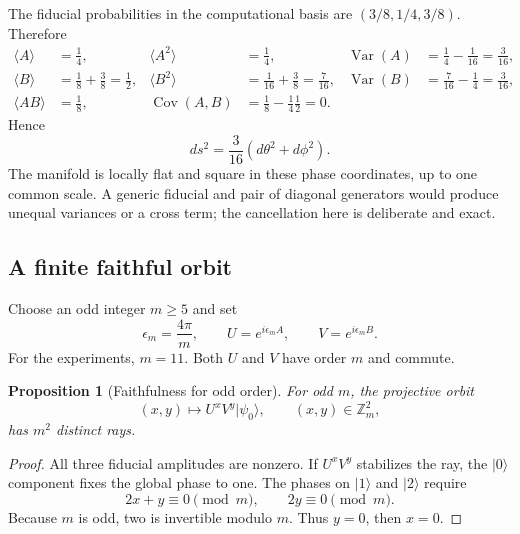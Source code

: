 \documentclass[11pt]{article}
\newtheorem{proposition}[theorem]{Proposition}
\theoremstyle{definition}
\theoremstyle{remark}
\newcommand{\Z}{\mathbb Z}
\newcommand{\ket}[1]{\lvert #1\rangle}
\begin{document}
The fiducial probabilities in the computational basis are
$(3/8,1/4,3/8)$. Therefore
\begin{align}
 \langle A\rangle&=\frac14,&
 \langle A^2\rangle&=\frac14,&
 \operatorname{Var}(A)&=\frac14-\frac1{16}=\frac3{16},\nonumber\\
 \langle B\rangle&=\frac18+\frac38=\frac12,&
 \langle B^2\rangle&=\frac1{16}+\frac38=\frac7{16},&
 \operatorname{Var}(B)&=\frac7{16}-\frac14=\frac3{16},\nonumber\\
 \langle AB\rangle&=\frac18,&
 \operatorname{Cov}(A,B)&=\frac18-\frac14\frac12=0.
 \label{eq:qutrit-moments}
\end{align}
Hence
\begin{equation}
 \boxed{
 ds^2=\frac3{16}(d\theta^2+d\phi^2)
 }.
 \label{eq:isotropic-fs}
\end{equation}
The manifold is locally flat and square in these phase coordinates, up to one
common scale. A generic fiducial and pair of diagonal generators would produce
unequal variances or a cross term; the cancellation here is deliberate and
exact.

\subsection{A finite faithful orbit}

Choose an odd integer $m\ge5$ and set
\begin{equation}
 \epsilon_m=\frac{4\pi}{m},\qquad
 U=e^{i\epsilon_mA},\qquad
 V=e^{i\epsilon_mB}.
 \label{eq:qutrit-finite-controls}
\end{equation}
For the experiments, $m=11$. Both $U$ and $V$ have order $m$ and commute.

\begin{proposition}[Faithfulness for odd order]
\label{prop:qutrit-faithful}
For odd $m$, the projective orbit
\begin{equation}
 (x,y)\longmapsto U^xV^y\ket{\psi_0},
 \qquad (x,y)\in\Z_m^2,
 \label{eq:qutrit-finite-orbit}
\end{equation}
has $m^2$ distinct rays.
\end{proposition}

\begin{proof}
All three fiducial amplitudes are nonzero. If $U^xV^y$ stabilizes the ray, the
$\ket0$ component fixes the global phase to one. The phases on $\ket1$ and
$\ket2$ require
\begin{equation}
 2x+y\equiv0\pmod m,\qquad 2y\equiv0\pmod m.
\end{equation}
Because $m$ is odd, two is invertible modulo $m$. Thus $y=0$, then $x=0$.
\end{proof}
\end{document}
